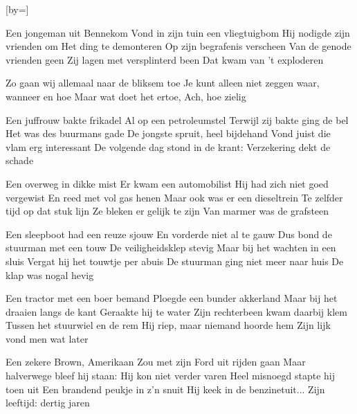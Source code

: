  

[by=]




\beginverse
    Een jongeman uit Bennekom
    Vond in zijn tuin een vliegtuigbom
    Hij nodigde zijn vrienden om
    Het ding te demonteren
    Op zijn begrafenis verscheen
    Van de genode vrienden geen
    Zij lagen met versplinterd been
    Dat kwam van 't exploderen
\endverse

\beginchorus
        Zo gaan wij allemaal naar de bliksem toe
        Je kunt alleen niet zeggen waar, wanneer en hoe
        Maar wat doet het ertoe, \brk  Ach, hoe zielig
\endchorus

\beginverse
    Een juffrouw bakte frikadel
    Al op een petroleumstel
    Terwijl zij bakte ging de bel
    Het was des buurmans gade
    De jongste spruit, heel bijdehand
    Vond juist die vlam erg interessant
    De volgende dag stond in de krant:
    Verzekering dekt de schade
\endverse

\beginverse
    Een overweg in dikke mist
    Er kwam een automobilist
    Hij had zich niet goed vergewist
    En reed met vol gas henen
    Maar ook was er een dieseltrein
    Te zelfder tijd op dat stuk lijn
    Ze bleken er gelijk te zijn
    Van marmer was de grafsteen
\endverse

\beginverse
    Een sleepboot had een reuze sjouw
    En vorderde niet al te gauw
    Dus bond de stuurman met een touw
    De veiligheidsklep stevig
    Maar bij het wachten in een sluis
    Vergat hij het touwtje per abuis
    De stuurman ging niet meer naar huis
    De klap was nogal hevig
\endverse

\beginverse
    Een tractor met een boer bemand
    Ploegde een bunder akkerland
    Maar bij het draaien langs de kant
    Geraakte hij te water
    Zijn rechterbeen kwam daarbij klem
    Tussen het stuurwiel en de rem
    Hij riep, maar niemand hoorde hem
    Zijn lijk vond men wat later
\endverse

\beginverse
    Een zekere Brown, Amerikaan
    Zou met zijn Ford uit rijden gaan
    Maar halverwege bleef hij staan:
    Hij kon niet verder varen
    Heel misnoegd stapte hij toen uit
    Een brandend peukje in z'n snuit
    Hij keek in de benzinetuit...
    Zijn leeftijd: dertig jaren
\endverse




\endsong
